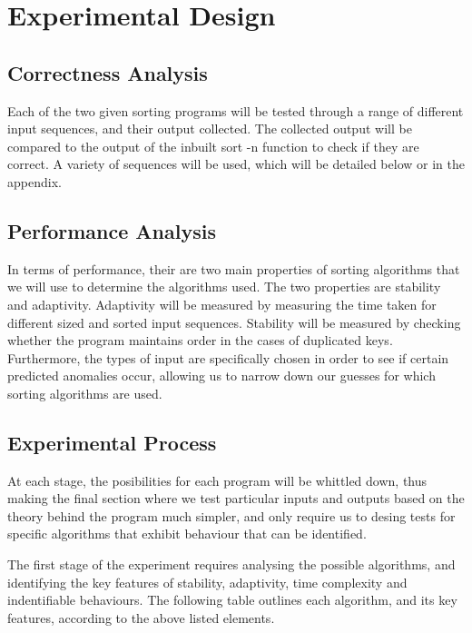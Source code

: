 \documentclass[a4paper]{article}
\begin{document}
\section{Experimental Design}

\subsection{Correctness Analysis}
Each of the two given sorting programs will be tested through a range of different input sequences, and their output collected. The collected output will be compared to the output of the inbuilt sort -n function to check if they are correct. A variety of sequences will be used, which will be detailed below or in the appendix.

\subsection{Performance Analysis}
In terms of performance, their are two main properties of sorting algorithms that we will use to determine the algorithms used. The two properties are stability and adaptivity. Adaptivity will be measured by measuring the time taken for different sized and sorted input sequences. Stability will be measured by checking whether the program maintains order in the cases of duplicated keys. Furthermore, the types of input are specifically chosen in order to see if certain predicted anomalies occur, allowing us to narrow down our guesses for which sorting algorithms are used.

\subsection{Experimental Process}
At each stage, the posibilities for each program will be whittled down, thus making the final section where we test particular inputs and outputs based on the theory behind the program much simpler, and only require us to desing tests for specific algorithms that exhibit behaviour that can be identified.

The first stage of the experiment requires analysing the possible algorithms, and identifying the key features of stability, adaptivity, time complexity and indentifiable behaviours. The following table outlines each algorithm, and its key features, according to the above listed elements.
\end{document}
